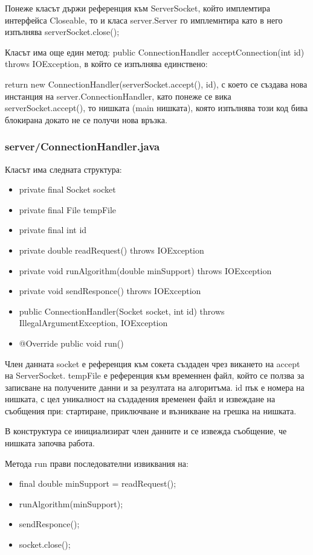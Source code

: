 \documentclass[a4paper, 12pt]{article}
\begin{document}
Понеже класът държи референция към ServerSocket,
който имплемтира интерфейса Closeable,
то и класа server.Server го имплемнтира като в него изпълнява serverSocket.close();

Класът има още един метод: public ConnectionHandler acceptConnection(int id) throws IOException,
в който се изпълнява единствено:

return new ConnectionHandler(serverSocket.accept(), id),
с което се създава нова инстанция на server.ConnectionHandler, като понеже се вика serverSocket.accept(),
то нишката (main нишката), която изпълнява този код бива блокирана докато не се получи нова връзка.

\subsubsection{server/ConnectionHandler.java}
Класът има следната структура:
\begin{itemize}
\item private final Socket socket
\item private final File tempFile
\item private final int id
\item private double readRequest() throws IOException
\item private void runAlgorithm(double minSupport) throws IOException
\item private void sendResponce() throws IOException
\item public ConnectionHandler(Socket socket, int id) throws IllegalArgumentException, IOException
\item @Override public void run()
\end{itemize}

Член данната socket е референция към сокета създаден чрез викането на accept на ServerSocket.
tempFile е референция към временнен файл, който се ползва за записване на получените данни и за резултата на алгоритъма.
id пък е номера на нишката, с цел уникалност на създадения временен файл и извеждане на съобщения при:
стартиране, приключване и възникване на грешка на нишката.

В конструктура се инициализират член данните и се извежда съобщение, че нишката започва работа.

Метода run прави последователни извиквания на:
\begin{itemize}
\item final double minSupport = readRequest();
\item runAlgorithm(minSupport);
\item sendResponce();
\item socket.close();
\end{itemize}
\end{document}
